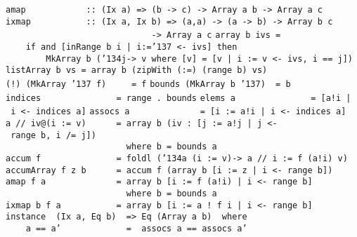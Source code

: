 \mbox{\tt amap\ \ \ \ \ \ \ \ \ \ \ \ ::\ (Ix\ a)\ =>\ (b\ ->\ c)\ ->\ Array\ a\ b\ ->\ Array\ a\ c}\\
\mbox{\tt ixmap\ \ \ \ \ \ \ \ \ \ \ ::\ (Ix\ a,\ Ix\ b)\ =>\ (a,a)\ ->\ (a\ ->\ b)\ ->\ Array\ b\ c}\\
\mbox{\tt \ \ \ \ \ \ \ \ \ \ \ \ \ \ \ \ \ \ \ \ \ \ \ \ \ \ \ \ \ ->\ Array\ a\ c}
%
%
%
%
%
%
%
%
%
%
%
%
\eprogB\noindent\bprogB
\mbox{\tt array\ b\ ivs\ =}\\
\mbox{\tt \ \ \ \ if\ and\ [inRange\ b\ i\ |\ i:={\char'137}\ <-\ ivs]\ then}\\
\mbox{\tt \ \ \ \ \ \ \ \ MkArray\ b\ ({\char'134}j->\ v\ where\ [v]\ =\ [v\ |\ i\ :=\ v\ <-\ ivs,\ i\ ==\ j])}
\eprogB\noindent\bprogB
\mbox{\tt listArray\ b\ vs\ =\ array\ b\ (zipWith\ (:=)\ (range\ b)\ vs)}
\eprogB\noindent\bprogB
\mbox{\tt (!)\ (MkArray\ {\char'137}\ f)\ \ \ \ \ =\ f}
\eprogB\noindent\bprogB
\mbox{\tt bounds\ (MkArray\ b\ {\char'137})\ \ =\ b}
\eprogB\noindent\bprogB
\mbox{\tt indices\ \ \ \ \ \ \ \ \ \ \ \ \ \ \ =\ range\ .\ bounds}
\eprogB\noindent\bprogB
\mbox{\tt elems\ a\ \ \ \ \ \ \ \ \ \ \ \ \ \ \ =\ [a!i\ |\ i\ <-\ indices\ a]}
\eprogB\noindent\bprogB
\mbox{\tt assocs\ a\ \ \ \ \ \ \ \ \ \ \ \ \ \ =\ [i\ :=\ a!i\ |\ i\ <-\ indices\ a]}
\eprogB\noindent\bprogB
\mbox{\tt a\ //\ iv@(i\ :=\ v)\ \ \ \ \ \ =\ array\ b\ (iv\ :\ [j\ :=\ a!j\ |\ j\ <-\ range\ b,\ i\ /=\ j])}\\
\mbox{\tt \ \ \ \ \ \ \ \ \ \ \ \ \ \ \ \ \ \ \ \ \ \ \ \ where\ b\ =\ bounds\ a}
\eprogB\noindent\bprogB
\mbox{\tt accum\ f\ \ \ \ \ \ \ \ \ \ \ \ \ \ \ =\ foldl\ ({\char'134}a\ (i\ :=\ v)->\ a\ //\ i\ :=\ f\ (a!i)\ v)}
\eprogB\noindent\bprogB
\mbox{\tt accumArray\ f\ z\ b\ \ \ \ \ \ =\ accum\ f\ (array\ b\ [i\ :=\ z\ |\ i\ <-\ range\ b])}
\eprogB\noindent\bprogB
\mbox{\tt amap\ f\ a\ \ \ \ \ \ \ \ \ \ \ \ \ \ =\ array\ b\ [i\ :=\ f\ (a!i)\ |\ i\ <-\ range\ b]}\\
\mbox{\tt \ \ \ \ \ \ \ \ \ \ \ \ \ \ \ \ \ \ \ \ \ \ \ \ where\ b\ =\ bounds\ a}
\eprogB\noindent\bprogB
\mbox{\tt ixmap\ b\ f\ a\ \ \ \ \ \ \ \ \ \ \ =\ array\ b\ [i\ :=\ a\ !\ f\ i\ |\ i\ <-\ range\ b]}
\eprogB\noindent\bprogB
\mbox{\tt instance\ \ (Ix\ a,\ Eq\ b)\ \ =>\ Eq\ (Array\ a\ b)\ \ where}\\
\mbox{\tt \ \ \ \ a\ ==\ a'\ \ \ \ \ \ \ \ \ \ \ \ \ =\ \ assocs\ a\ ==\ assocs\ a'}
